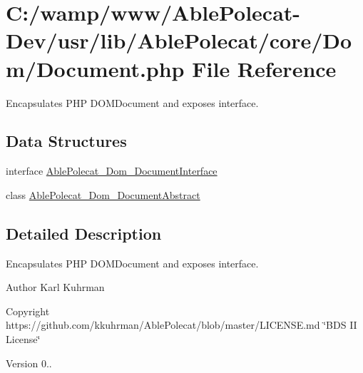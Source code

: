 \hypertarget{_document_8php}{}\section{C\+:/wamp/www/\+Able\+Polecat-\/\+Dev/usr/lib/\+Able\+Polecat/core/\+Dom/\+Document.php File Reference}
\label{_document_8php}


Encapsulates P\+H\+P D\+O\+M\+Document and exposes interface.  


\subsection*{Data Structures}
\begin{DoxyCompactItemize}
\item 
interface \hyperlink{interface_able_polecat___dom___document_interface}{Able\+Polecat\+\_\+\+Dom\+\_\+\+Document\+Interface}
\item 
class \hyperlink{class_able_polecat___dom___document_abstract}{Able\+Polecat\+\_\+\+Dom\+\_\+\+Document\+Abstract}
\end{DoxyCompactItemize}


\subsection{Detailed Description}
Encapsulates P\+H\+P D\+O\+M\+Document and exposes interface. 

\begin{DoxyAuthor}{Author}
Karl Kuhrman 
\end{DoxyAuthor}
\begin{DoxyCopyright}{Copyright}
https\+://github.com/kkuhrman/\+Able\+Polecat/blob/master/\+L\+I\+C\+E\+N\+S\+E.\+md \char`\"{}\+B\+D\+S I\+I License\char`\"{} 
\end{DoxyCopyright}
\begin{DoxyVersion}{Version}
0.. 
\end{DoxyVersion}
